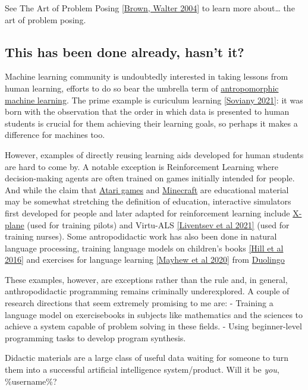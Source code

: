 See The Art of Problem Posing
\href{https://www.taylorfrancis.com/books/mono/10.4324/9781410611833/art-problem-posing-stephen-brown-marion-walter}{{[}Brown,
Walter 2004{]}} to learn more about\ldots{} the art of problem posing.


\subsection{This has been done already, hasn't
it?}\label{this-has-been-done-already-hasnt-it}

Machine learning community is undoubtedly interested in taking lessons
from human learning, efforts to do so bear the umbrella term of
\href{https://ieeexplore.ieee.org/document/8481253}{antropomorphic
machine learning}. The prime example is curiculum learning
\href{https://arxiv.org/abs/2101.10382}{{[}Soviany 2021{]}}: it was born
with the observation that the order in which data is presented to human
students is crucial for them achieving their learning goals, so perhaps
it makes a difference for machines too.

However, examples of directly reusing learning aids developed for human
students are hard to come by. A notable exception is Reinforcement
Learning where decision-making agents are often trained on games
initially intended for people. And while the claim that
\href{https://gym.openai.com/envs/\#atari}{Atari games} and
\href{https://www.microsoft.com/en-us/research/project/project-malmo/}{Minecraft}
are educational material may be somewhat stretching the definition of
education, interactive simulators first developed for people and later
adapted for reinforcement learning include
\href{https://openreview.net/pdf?id=H1mMHwt9X}{X-plane} (used for
training pilots) and Virtu-ALS
\href{https://pubmed.ncbi.nlm.nih.gov/34977561/}{{[}Liventsev et al
2021{]}} (used for training nurses). Some antropodidactic work has also
been done in natural language processing, training language models on
children's books \href{https://arxiv.org/pdf/1511.02301.pdf}{{[}Hill et
al 2016{]}} and exercises for language learning
\href{https://aclanthology.org/2020.ngt-1.28.pdf}{{[}Mayhew et al
2020{]}} from \href{https://www.duolingo.com/}{Duolingo}

These examples, however, are exceptions rather than the rule and, in
general, anthropodidactic programming remains criminally underexplored.
A couple of research directions that seem extremely promising to me are:
- Training a language model on exercisebooks in subjects like
mathematics and the sciences to achieve a system capable of problem
solving in these fields. - Using beginner-level programming tasks to
develop program synthesis.

Didactic materials are a large class of useful data waiting for someone
to turn them into a successful artificial intelligence system/product.
Will it be \emph{you}, \%username\%?